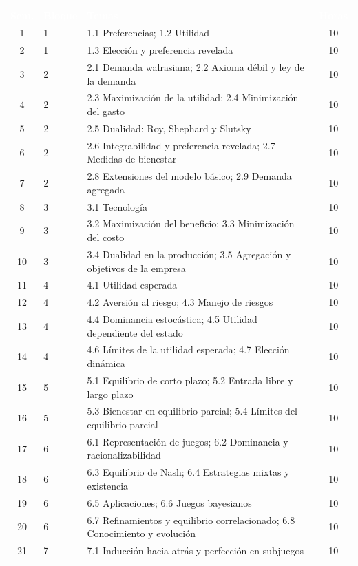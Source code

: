\documentclass[11pt,a4paper]{article}
\renewcommand{\arraystretch}{1.3}
\newcommand{\cab}[1]{\textcolor{white}{\sffamily\bfseries #1}}
\newcommand{\filasalternas}{\rowcolors{2}{white}{tonoPalido}}
\begin{document}
{\small\filasalternas
\renewcommand{\arraystretch}{1.1}\noindent\begin{tabularx}{\textwidth}{clXc}
\toprule
\rowcolor{tonoOscuro}\cab{Sem.} & \cab{Bloque} & \cab{Temas} & \cab{Horas} \\
\midrule
1  & 1 & 1.1 Preferencias; 1.2 Utilidad & 10 \\
2  & 1 & 1.3 Elección y preferencia revelada & 10 \\
\midrule
3  & 2 & 2.1 Demanda walrasiana; 2.2 Axioma débil y ley de la demanda & 10 \\
4  & 2 & 2.3 Maximización de la utilidad; 2.4 Minimización del gasto & 10 \\
5  & 2 & 2.5 Dualidad: Roy, Shephard y Slutsky & 10 \\
6  & 2 & 2.6 Integrabilidad y preferencia revelada; 2.7 Medidas de bienestar & 10 \\
7  & 2 & 2.8 Extensiones del modelo básico; 2.9 Demanda agregada & 10 \\
\midrule
8  & 3 & 3.1 Tecnología & 10 \\
9  & 3 & 3.2 Maximización del beneficio; 3.3 Minimización del costo & 10 \\
10 & 3 & 3.4 Dualidad en la producción; 3.5 Agregación y objetivos de la empresa & 10 \\
\midrule
11 & 4 & 4.1 Utilidad esperada & 10 \\
12 & 4 & 4.2 Aversión al riesgo; 4.3 Manejo de riesgos & 10 \\
13 & 4 & 4.4 Dominancia estocástica; 4.5 Utilidad dependiente del estado & 10 \\
14 & 4 & 4.6 Límites de la utilidad esperada; 4.7 Elección dinámica & 10 \\
\midrule
15 & 5 & 5.1 Equilibrio de corto plazo; 5.2 Entrada libre y largo plazo & 10 \\
16 & 5 & 5.3 Bienestar en equilibrio parcial; 5.4 Límites del equilibrio parcial & 10 \\
\midrule
17 & 6 & 6.1 Representación de juegos; 6.2 Dominancia y racionalizabilidad & 10 \\
18 & 6 & 6.3 Equilibrio de Nash; 6.4 Estrategias mixtas y existencia & 10 \\
19 & 6 & 6.5 Aplicaciones; 6.6 Juegos bayesianos & 10 \\
20 & 6 & 6.7 Refinamientos y equilibrio correlacionado; 6.8 Conocimiento y evolución & 10 \\
\midrule
21 & 7 & 7.1 Inducción hacia atrás y perfección en subjuegos & 10 \\

\end{tabularx}}
\end{document}
